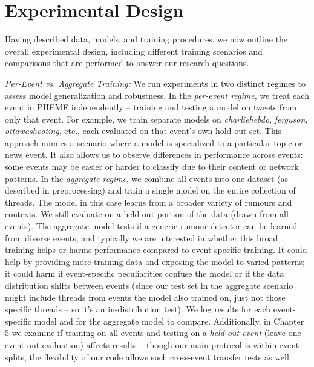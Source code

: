 \documentclass{cshonours}
\begin{document}
\section{Experimental Design}

Having described data, models, and training procedures, we now outline the overall experimental design, including different training scenarios and comparisons that are performed to answer our research questions.

\emph{Per-Event vs. Aggregate Training:} We run experiments in two distinct regimes to assess model generalization and robustness. In the \emph{per-event regime}, we treat each event in PHEME independently – training and testing a model on tweets from only that event. For example, we train separate models on \emph{charliehebdo}, \emph{ferguson}, \emph{ottawashooting}, etc., each evaluated on that event's own hold-out set. This approach mimics a scenario where a model is specialized to a particular topic or news event. It also allows us to observe differences in performance across events: some events may be easier or harder to classify due to their content or network patterns. In the \emph{aggregate regime}, we combine all events into one dataset (as described in preprocessing) and train a single model on the entire collection of threads. The model in this case learns from a broader variety of rumours and contexts. We still evaluate on a held-out portion of the data (drawn from all events). The aggregate model tests if a generic rumour detector can be learned from diverse events, and typically we are interested in whether this broad training helps or harms performance compared to event-specific training. It could help by providing more training data and exposing the model to varied patterns; it could harm if event-specific peculiarities confuse the model or if the data distribution shifts between events (since our test set in the aggregate scenario might include threads from events the model also trained on, just not those specific threads – so it's an in-distribution test). We log results for each event-specific model and for the aggregate model to compare. Additionally, in Chapter 5 we examine if training on all events and testing on a \emph{held-out event} (leave-one-event-out evaluation) affects results – though our main protocol is within-event splits, the flexibility of our code allows such cross-event transfer tests as well.
\end{document}
